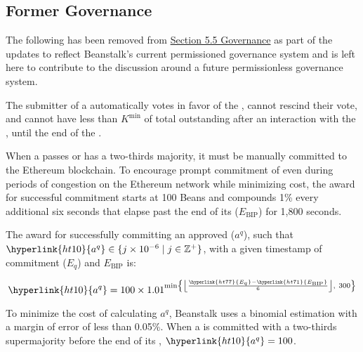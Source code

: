 \documentclass[class=article, crop=false]{standalone}
\begin{document}

\subsection{Former Governance}

The following has been removed from \hyperlink{subsection.5.5}{Section 5.5 Governance} as part of the updates to reflect Beanstalk's current permissioned governance system and is left here to contribute to the discussion around a future permissionless governance system. 

The submitter of a  automatically votes in favor of the , cannot rescind their vote, and cannot have less than \hyperlink{ht119}{$K^{\text{min}}$} of total outstanding  after an interaction with the , until the end of the .

When a  passes or has a two-thirds majority, it must be manually committed to the Ethereum blockchain. To encourage prompt commitment of  even during periods of congestion on the Ethereum network while minimizing cost, the award for successful commitment starts at 100 Beans and compounds 1\% every additional six seconds that elapse past the end of its  (\hyperlink{ht71}{$E_{\text{BIP}}$}) for 1,800 seconds.

The award for successfully committing an approved  (\hyperlink{ht10}{$a^q$}), such that $\hyperlink{ht10}{a^q} \in \{j \times 10^{-6} \mid j \in \mathbb{Z}^{+} \}$, with a given timestamp of commitment (\hyperlink{ht77}{$E_q$}) and \hyperlink{ht71}{$E_{\text{BIP}}$} is:

    $$
        \hyperlink{ht10}{a^q} = 
            100 \times 
            1.01^{\text{min}\left
                \{\left\lfloor\frac{\hyperlink{ht77}{E_q} - \hyperlink{ht71}
                                {E_{\text{BIP}}}}{6}\right\rfloor,\ 300\right\}}
    $$

To minimize the cost of calculating \hyperlink{ht10}{$a^q$}, Beanstalk uses a binomial estimation with a margin of error of less than 0.05\%. When a  is committed with a two-thirds supermajority before the end of its , $\hyperlink{ht10}{a^q} = 100$.
\end{document}
